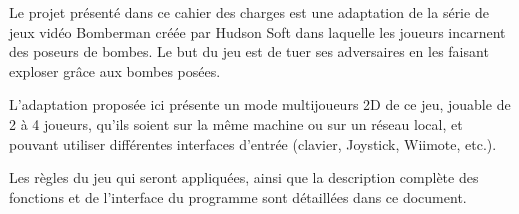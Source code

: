 Le projet présenté dans ce cahier des charges est une adaptation de la série de jeux vidéo Bomberman créée par Hudson Soft dans laquelle les joueurs incarnent des poseurs de bombes. Le but du jeu est de tuer ses adversaires en les faisant exploser grâce aux bombes posées.

\vspace{0.5cm}

L'adaptation proposée ici présente un mode multijoueurs 2D de ce jeu, jouable de 2 à 4 joueurs, qu'ils soient sur la même machine ou sur un réseau local, et pouvant utiliser différentes interfaces d'entrée (clavier, Joystick, Wiimote, etc.).

\vspace{0.5cm}

Les règles du jeu qui seront appliquées, ainsi que la description complète des fonctions et de l'interface du programme sont détaillées dans ce document.